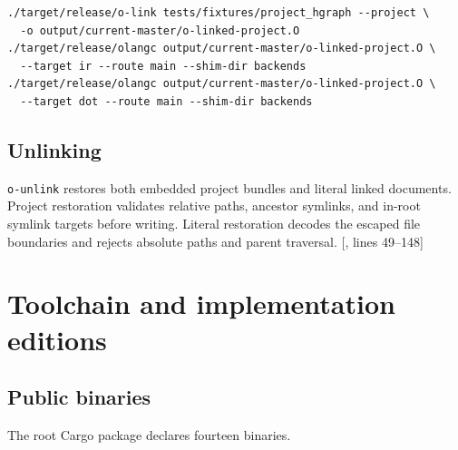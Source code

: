 \documentclass[11pt,oneside]{article}
\newcommand{\src}[2]{\textcolor{OSlate}{\scriptsize[\path{#1}, lines #2]}\allowbreak}
\begin{document}
\begin{lstlisting}[style=plaincode]
./target/release/o-link tests/fixtures/project_hgraph --project \
  -o output/current-master/o-linked-project.O
./target/release/olangc output/current-master/o-linked-project.O \
  --target ir --route main --shim-dir backends
./target/release/olangc output/current-master/o-linked-project.O \
  --target dot --route main --shim-dir backends
\end{lstlisting}

\subsection{Unlinking}

\texttt{o-unlink} restores both embedded project bundles and literal linked
documents. Project restoration validates relative paths, ancestor symlinks,
and in-root symlink targets before writing. Literal restoration decodes the
escaped file boundaries and rejects absolute paths and parent traversal.
\src{src/bin/ounlink.rs}{49--148}

\section{Toolchain and implementation editions}
\label{sec:toolchain}

\subsection{Public binaries}

The root Cargo package declares fourteen binaries.
\end{document}
